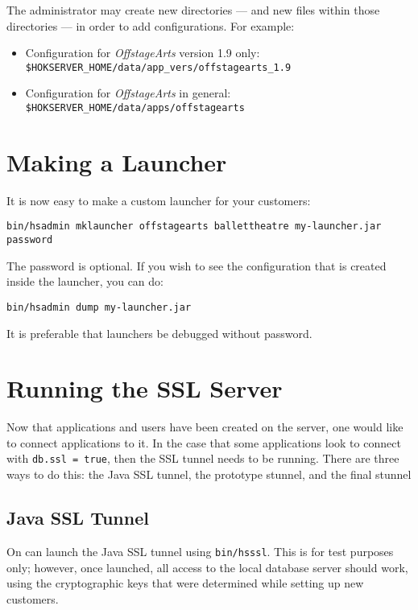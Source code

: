 \documentclass[11pt]{article}
\begin{document}
The administrator may create new directories --- and new files within
those directories --- in order to add configurations.  For example:
 \begin{itemize}
 \item Configuration for \emph{OffstageArts} version 1.9 only: {\tt \$HOKSERVER\_HOME/data/app\_vers/offstagearts\_1.9}
 \item Configuration for \emph{OffstageArts} in general: {\tt \$HOKSERVER\_HOME/data/apps/offstagearts}
 \end{itemize}

\section{Making a Launcher}

It is now easy to make a custom launcher for your customers:
\begin{verbatim}
bin/hsadmin mklauncher offstagearts ballettheatre my-launcher.jar password
\end{verbatim}

The password is optional.  If you wish to see the configuration that is created inside the launcher, you can do:
\begin{verbatim}
bin/hsadmin dump my-launcher.jar
\end{verbatim}

It is preferable that launchers be debugged without password.

\section{Running the SSL Server}

Now that applications and users have been created on the server, one
would like to connect applications to it.  In the case that some
applications look to connect with {\tt db.ssl = true}, then the SSL
tunnel needs to be running.  There are three ways to do this: the Java SSL tunnel, the prototype stunnel, and the final stunnel

\subsection{Java SSL Tunnel}

On can launch the Java SSL tunnel using {\tt bin/hsssl}.  This is for test purposes only; however, once launched, all access to the local database server should work, using the cryptographic keys that were determined while setting up new customers.
\end{document}
